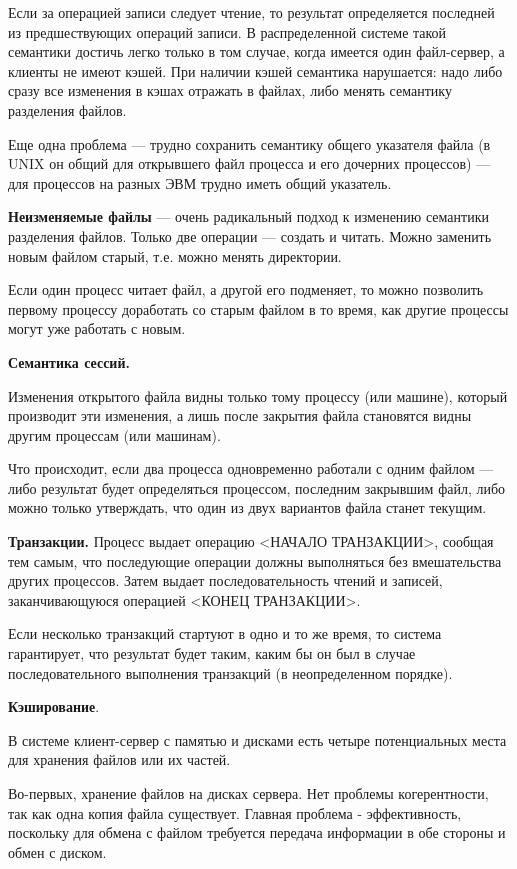 Если за операцией записи следует чтение, то результат определяется последней из предшествующих операций записи. 
В распределенной системе такой семантики достичь легко только в том случае, когда имеется один файл-сервер, а клиенты не имеют кэшей. 
При наличии кэшей семантика нарушается: надо либо сразу все изменения в кэшах отражать в файлах, либо менять семантику разделения файлов. 

Еще одна проблема --- трудно сохранить семантику общего указателя файла (в UNIX он общий для открывшего файл процесса и его дочерних процессов) --- для процессов на разных ЭВМ трудно иметь общий указатель.

\textbf{Неизменяемые файлы} --- очень радикальный подход к изменению семантики разделения файлов. 
Только две операции --- создать и читать. 
Можно заменить новым файлом старый, т.е. можно менять директории. 

Если один процесс читает файл, а другой его подменяет, то можно позволить первому процессу доработать со старым файлом в то время, как другие процессы могут уже работать с новым.

\textbf{Семантика сессий.}

Изменения открытого файла видны только тому процессу (или машине), который производит эти изменения, а лишь после закрытия файла становятся видны другим процессам (или машинам). 

Что происходит, если два процесса одновременно работали с одним файлом --- либо результат будет определяться процессом, последним закрывшим файл, либо можно только утверждать, что один из двух вариантов файла станет текущим.

\textbf{Транзакции.}
Процесс выдает операцию <НАЧАЛО ТРАНЗАКЦИИ>, сообщая тем самым, что последующие операции должны выполняться без вмешательства других процессов.
Затем выдает последовательность чтений и записей, заканчивающуюся операцией <КОНЕЦ ТРАНЗАКЦИИ>. 

Если несколько транзакций стартуют в одно и то же время, то система гарантирует, что результат будет таким, каким бы он был в случае последовательного выполнения транзакций (в неопределенном порядке).

\textbf{Кэширование}. 

В системе клиент-сервер с памятью и дисками есть четыре потенциальных места для хранения файлов или их частей. 

Во-первых, хранение файлов на дисках сервера. 
Нет проблемы когерентности, так как одна копия файла существует. 
Главная проблема - эффективность, поскольку для обмена с файлом требуется передача информации в обе стороны и обмен с диском. 

